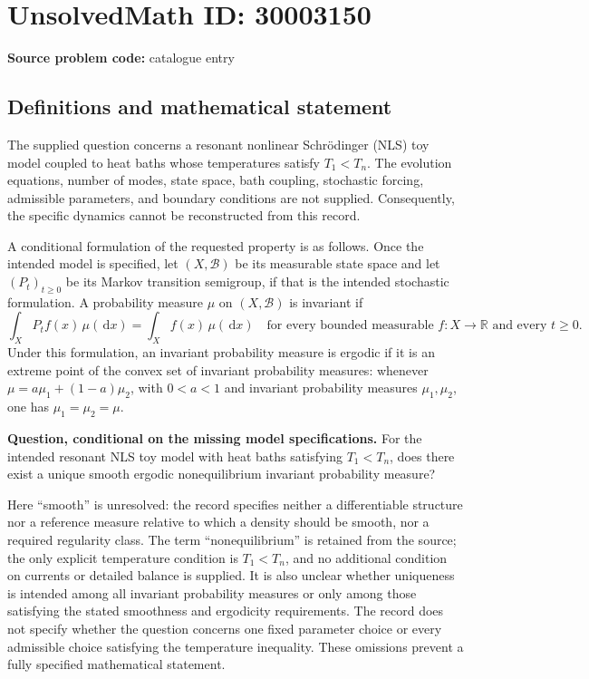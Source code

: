 \documentclass[11pt]{article}
\newcommand{\R}{\mathbb{R}}
\newcommand{\dd}{\,\mathrm{d}}
\begin{document}
\section*{UnsolvedMath ID: 30003150}
\textbf{Source problem code:} catalogue entry
\subsection{Definitions and mathematical statement}
The supplied question concerns a resonant nonlinear Schr\"odinger (NLS) toy model coupled to heat baths whose temperatures satisfy \(T_1<T_n\). The evolution equations, number of modes, state space, bath coupling, stochastic forcing, admissible parameters, and boundary conditions are not supplied. Consequently, the specific dynamics cannot be reconstructed from this record.

A conditional formulation of the requested property is as follows. Once the intended model is specified, let \((X,\mathcal B)\) be its measurable state space and let \((P_t)_{t\geq 0}\) be its Markov transition semigroup, if that is the intended stochastic formulation. A probability measure \(\mu\) on \((X,\mathcal B)\) is invariant if
\[
\int_X P_t f(x)\,\mu(\dd x)=\int_X f(x)\,\mu(\dd x)
\quad\text{for every bounded measurable }f:X\to\R\text{ and every }t\geq 0.
\]
Under this formulation, an invariant probability measure is ergodic if it is an extreme point of the convex set of invariant probability measures: whenever \(\mu=a\mu_1+(1-a)\mu_2\), with \(0<a<1\) and invariant probability measures \(\mu_1,\mu_2\), one has \(\mu_1=\mu_2=\mu\).

\textbf{Question, conditional on the missing model specifications.} For the intended resonant NLS toy model with heat baths satisfying \(T_1<T_n\), does there exist a unique smooth ergodic nonequilibrium invariant probability measure?

Here ``smooth'' is unresolved: the record specifies neither a differentiable structure nor a reference measure relative to which a density should be smooth, nor a required regularity class. The term ``nonequilibrium'' is retained from the source; the only explicit temperature condition is \(T_1<T_n\), and no additional condition on currents or detailed balance is supplied. It is also unclear whether uniqueness is intended among all invariant probability measures or only among those satisfying the stated smoothness and ergodicity requirements. The record does not specify whether the question concerns one fixed parameter choice or every admissible choice satisfying the temperature inequality. These omissions prevent a fully specified mathematical statement.
\end{document}
